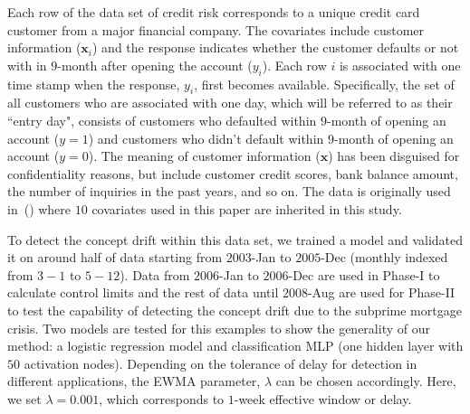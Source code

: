 \documentclass[twoside,11pt]{article}
\begin{document}
\begin{figure}[!htbp]
{%
}
\label{fig:credit_default}
\end{figure}
Each row of the data set of credit risk corresponds to a unique credit card customer from a major financial company. The covariates include customer information ($\bm {x}_i$) and the response indicates whether the customer defaults or not with in $9$-month after opening the account ($y_i$). Each row $i$ is associated with one time stamp when the response, $y_i$, first becomes available. Specifically, the set of all customers who are associated with one day, which will be referred to as their ``entry day", consists of customers who defaulted within $9$-month of opening an account ($y=1$) and customers who didn't default within $9$-month of opening an account ($y=0$). The meaning of customer information ($\bm {x}$) has been disguised for confidentiality reasons, but include customer credit scores, bank balance amount, the number of inquiries in the past years, and so on. The data is originally used in~(\cite{im2012time}) where $10$ covariates used in this paper are inherited in this study. 

To detect the concept drift within this data set, we trained a model and validated it on around half of data starting from $2003$-Jan to $2005$-Dec (monthly indexed from $3-1$ to $5-12$). Data from $2006$-Jan to $2006$-Dec are used in Phase-I to calculate control limits and the rest of data until $2008$-Aug are used for Phase-II to test the capability of detecting the concept drift due to the subprime mortgage crisis. Two models are tested for this examples to show the generality of our method: a logistic regression model and classification MLP (one hidden layer with $50$ activation nodes). Depending on the tolerance of delay for detection in different applications, the EWMA parameter, $\lambda$ can be chosen accordingly. Here, we set $ \lambda = 0.001$, which corresponds to $1$-week effective window or delay.
\end{document}
